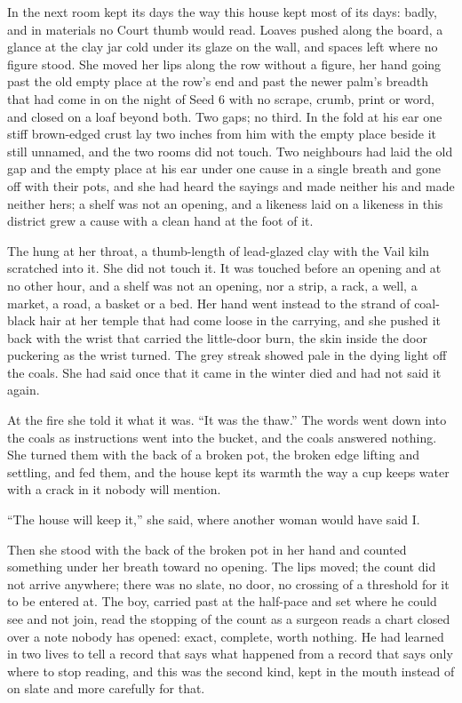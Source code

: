 In the next room  kept its days the way this house kept most of its days: badly, and in materials no Court thumb would read. Loaves pushed along the board, a glance at the clay jar cold under its glaze on the wall, and spaces left where no figure stood. She moved her lips along the row without a figure, her hand going past the old empty place at the row's end and past the newer palm's breadth that had come in on the night of Seed 6 with no scrape, crumb, print or word, and closed on a loaf beyond both. Two gaps; no third. In the fold at his ear one stiff brown-edged crust lay two inches from him with the empty place beside it still unnamed, and the two rooms did not touch. Two neighbours had laid the old gap and the empty place at his ear under one cause in a single breath and gone off with their pots, and she had heard the sayings and made neither his and made neither hers; a shelf was not an opening, and a likeness laid on a likeness in this district grew a cause with a clean hand at the foot of it.

The  hung at her throat, a thumb-length of lead-glazed clay with the Vail kiln scratched into it. She did not touch it. It was touched before an opening and at no other hour, and a shelf was not an opening, nor a strip, a rack, a well, a market, a road, a basket or a bed. Her hand went instead to the strand of coal-black hair at her temple that had come loose in the carrying, and she pushed it back with the wrist that carried the little-door burn, the skin inside the door puckering as the wrist turned. The grey streak showed pale in the dying light off the coals. She had said once that it came in the winter  died and had not said it again.

At the fire she told it what it was. “It was the thaw.” The words went down into the coals as instructions went into the bucket, and the coals answered nothing. She turned them with the back of a broken pot, the broken edge lifting and settling, and fed them, and the house kept its warmth the way a cup keeps water with a crack in it nobody will mention.

“The house will keep it,” she said, where another woman would have said I.

Then she stood with the back of the broken pot in her hand and counted something under her breath toward no opening. The lips moved; the count did not arrive anywhere; there was no slate, no door, no crossing of a threshold for it to be entered at. The boy, carried past at the half-pace and set where he could see and not join, read the stopping of the count as a surgeon reads a chart closed over a note nobody has opened: exact, complete, worth nothing. He had learned in two lives to tell a record that says what happened from a record that says only where to stop reading, and this was the second kind, kept in the mouth instead of on slate and more carefully for that.

